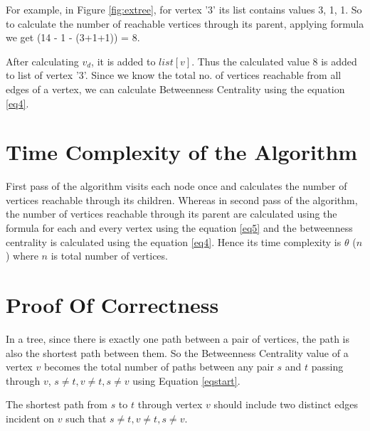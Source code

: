 For example, in Figure \ref{fig:extree}, for vertex '3' its list contains values 3, 1, 1. So to calculate the number of reachable vertices through its parent, applying formula we get (14 - 1 - (3+1+1)) = 8.

After calculating $v_{d}$, it is added to $list[v]$.
Thus the calculated value 8 is added to list of vertex '3'.
Since we know the total no. of vertices reachable from all edges of a vertex, we can calculate Betweenness Centrality using the equation \ref{eq4}.



\section{Time Complexity of the Algorithm}
First pass of the algorithm visits each node once and calculates the number of vertices reachable through its children.
Whereas in second pass of the algorithm, the number of vertices reachable through its parent are calculated using the formula for each and every vertex using the equation \ref{eq5} and the betweenness centrality is calculated using the equation \ref{eq4}. Hence its time complexity is $\theta$ ($n$) where $n$ is total number of vertices.


\section{Proof Of Correctness}

In a tree, since there is exactly one path between a pair of vertices, the path is also the shortest path between them. So the Betweenness Centrality value of a vertex $v$ becomes the total number of paths between any pair $s$ and $t$ passing through $v$, $s \neq t, v\neq t, s\neq v$ using Equation \ref{eqstart}. 

\begin{lemma}
\label{lemma:first}
The shortest path from $s$ to $t$ through vertex $v$ should include two distinct edges incident on $v$ such that  $s \neq t, v\neq t, s\neq v$.
\end{lemma}


